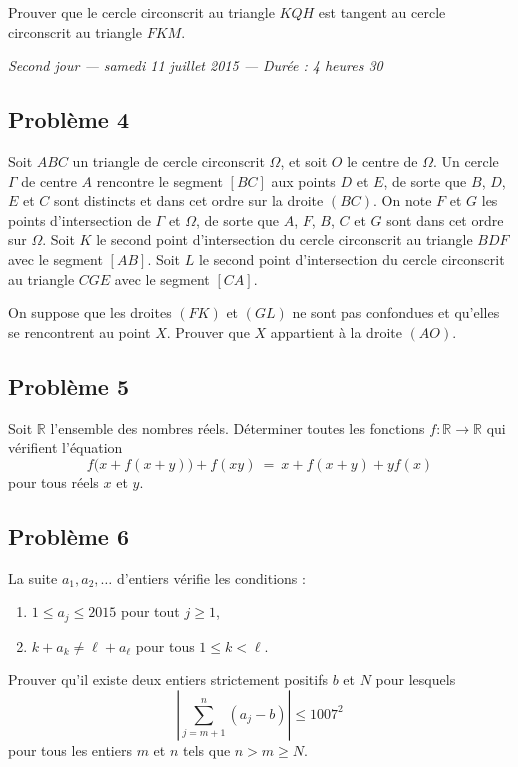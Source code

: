 Prouver que le cercle circonscrit au triangle $KQH$ est tangent au cercle circonscrit au triangle $FKM$.

\bigskip
\begin{center}
  \emph{Second jour --- samedi 11 juillet 2015 --- Durée : 4 heures 30}
\end{center}

\subsection*{Problème 4}
Soit $ABC$ un triangle de cercle circonscrit $\Omega$, et soit $O$ le centre de $\Omega$. Un cercle $\Gamma$ de
centre $A$ rencontre le segment $[BC]$ aux points $D$ et $E$, de sorte que $B$, $D$, $E$ et $C$ sont distincts
et dans cet ordre sur la droite $(BC)$. On note $F$ et $G$ les points d'intersection de $\Gamma$ et $\Omega$,
de sorte que $A$, $F$, $B$, $C$ et $G$ sont dans cet ordre sur $\Omega$. Soit $K$ le second point
d'intersection du cercle circonscrit au triangle $BDF$ avec le segment $[AB]$. Soit $L$ le second point
d'intersection du cercle circonscrit au triangle $CGE$ avec le segment $[CA]$.

On suppose que les droites $(FK)$ et $(GL)$ ne sont pas confondues et qu'elles se rencontrent au point $X$.
Prouver que $X$ appartient à la droite $(AO)$.

\subsection*{Problème 5}
Soit $\mathbb{R}$ l'ensemble des nombres réels. Déterminer toutes les fonctions
$f : \mathbb{R} \to \mathbb{R}$ qui vérifient l'équation
\[
f\bigl(x + f(x + y)\bigr) + f(xy) \ = \ x + f(x + y) + yf(x)
\]
pour tous réels $x$ et $y$.

\subsection*{Problème 6}
La suite $a_1, a_2, \ldots$ d'entiers vérifie les conditions :
\begin{enumerate}
  \item[(i)] $1 \leqslant a_j \leqslant 2015$ pour tout $j \geqslant 1$,
  \item[(ii)] $k + a_k \neq \ell + a_\ell$ pour tous $1 \leqslant k < \ell$.
\end{enumerate}
Prouver qu'il existe deux entiers strictement positifs $b$ et $N$ pour lesquels
\[
\left|\sum_{j=m+1}^{n} (a_j - b)\right| \leqslant 1007^2
\]
pour tous les entiers $m$ et $n$ tels que $n > m \geqslant N$.
